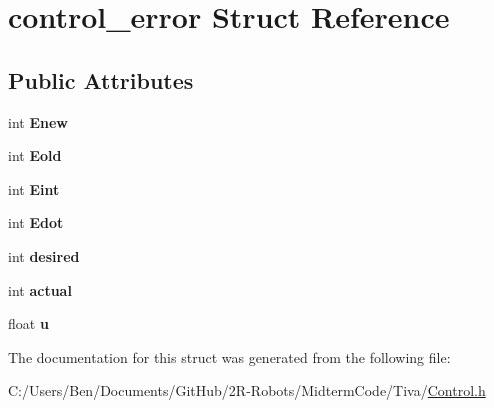 \hypertarget{structcontrol__error}{}\section{control\+\_\+error Struct Reference}
\label{structcontrol__error}
\subsection*{Public Attributes}
\begin{DoxyCompactItemize}
\item 
\mbox{\label{structcontrol__error_a520d0aa203dfb6a8fc2ef6ea67742634}} 
int {\bfseries Enew}
\item 
\mbox{\label{structcontrol__error_a544db3cda64df9fdd64338941e583d3c}} 
int {\bfseries Eold}
\item 
\mbox{\label{structcontrol__error_a0134001840bac616204e9b36ce7fc53e}} 
int {\bfseries Eint}
\item 
\mbox{\label{structcontrol__error_a5a4f2cb0d9739ecbc2391462d4b0f07d}} 
int {\bfseries Edot}
\item 
\mbox{\label{structcontrol__error_a50083d46933f91ac7af1ab23eda49ddb}} 
int {\bfseries desired}
\item 
\mbox{\label{structcontrol__error_a45eeafb4f62fb62128e4f1dde8b134db}} 
int {\bfseries actual}
\item 
\mbox{\label{structcontrol__error_acf5c228017b873e0db8d1e5a4c6cd87c}} 
float {\bfseries u}
\end{DoxyCompactItemize}


The documentation for this struct was generated from the following file\+:\begin{DoxyCompactItemize}
\item 
C\+:/\+Users/\+Ben/\+Documents/\+Git\+Hub/2\+R-\/\+Robots/\+Midterm\+Code/\+Tiva/\mbox{\hyperlink{_control_8h}{Control.\+h}}\end{DoxyCompactItemize}
